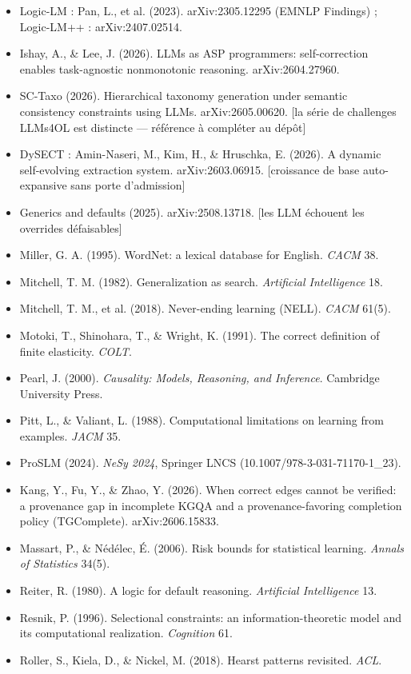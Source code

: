 \documentclass[11pt]{article}
\begin{document}
\begin{itemize}
\item Logic-LM : Pan, L., et al. (2023). arXiv:2305.12295 (EMNLP Findings) ; Logic-LM++ : arXiv:2407.02514.
\item Ishay, A., \& Lee, J. (2026). LLMs as ASP programmers: self-correction enables task-agnostic nonmonotonic reasoning. arXiv:2604.27960.
\item SC-Taxo (2026). Hierarchical taxonomy generation under semantic consistency constraints using LLMs. arXiv:2605.00620. [la série de challenges LLMs4OL est distincte — référence à compléter au dépôt]
\item DySECT : Amin-Naseri, M., Kim, H., \& Hruschka, E. (2026). A dynamic self-evolving extraction system. arXiv:2603.06915. [croissance de base auto-expansive sans porte d'admission]
\item Generics and defaults (2025). arXiv:2508.13718. [les LLM échouent les overrides défaisables]
\item Miller, G. A. (1995). WordNet: a lexical database for English. \emph{CACM} 38.
\item Mitchell, T. M. (1982). Generalization as search. \emph{Artificial Intelligence} 18.
\item Mitchell, T. M., et al. (2018). Never-ending learning (NELL). \emph{CACM} 61(5).
\item Motoki, T., Shinohara, T., \& Wright, K. (1991). The correct definition of finite elasticity. \emph{COLT}.
\item Pearl, J. (2000). \emph{Causality: Models, Reasoning, and Inference}. Cambridge University Press.
\item Pitt, L., \& Valiant, L. (1988). Computational limitations on learning from examples. \emph{JACM} 35.
\item ProSLM (2024). \emph{NeSy 2024}, Springer LNCS (10.1007/978-3-031-71170-1\_23).
\item Kang, Y., Fu, Y., \& Zhao, Y. (2026). When correct edges cannot be verified: a provenance gap in incomplete KGQA and a provenance-favoring completion policy (TGComplete). arXiv:2606.15833.
\item Massart, P., \& Nédélec, É. (2006). Risk bounds for statistical learning. \emph{Annals of Statistics} 34(5).
\item Reiter, R. (1980). A logic for default reasoning. \emph{Artificial Intelligence} 13.
\item Resnik, P. (1996). Selectional constraints: an information-theoretic model and its computational realization. \emph{Cognition} 61.
\item Roller, S., Kiela, D., \& Nickel, M. (2018). Hearst patterns revisited. \emph{ACL}.

\end{itemize}
\end{document}

